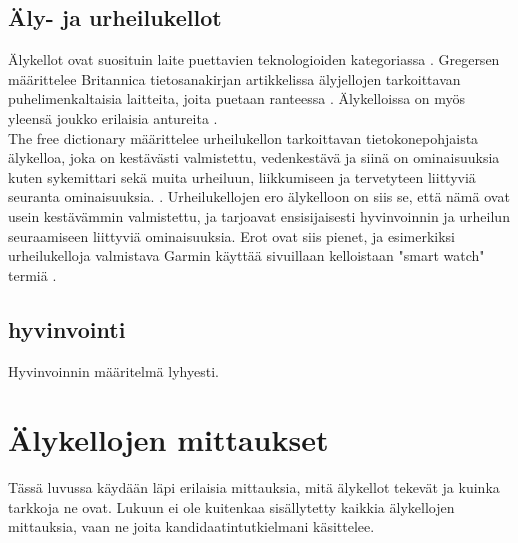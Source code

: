 \documentclass[utf8,bachelor,finnish]{bachelor}
\begin{document}
  \section{Äly- ja urheilukellot}
  Älykellot ovat suosituin laite puettavien teknologioiden kategoriassa \parencite{godfrey2018z}. Gregersen määrittelee Britannica
   tietosanakirjan artikkelissa älyjellojen tarkoittavan puhelimenkaltaisia laitteita, joita puetaan ranteessa \parencite{Gregersen_watch_2023}.
    Älykelloissa on myös yleensä joukko erilaisia antureita \parencite{rawassizadeh_wearables_2014}.\\

  The free dictionary määrittelee urheilukellon tarkoittavan tietokonepohjaista älykelloa, joka on kestävästi valmistettu, vedenkestävä ja siinä on ominaisuuksia kuten
    sykemittari sekä muita urheiluun, liikkumiseen ja tervetyteen liittyviä seuranta ominaisuuksia. \parencite{sportswatch_tfd}. Urheilukellojen ero älykelloon on siis se,
     että nämä ovat usein kestävämmin valmistettu, ja tarjoavat ensisijaisesti hyvinvoinnin ja urheilun seuraamiseen liittyviä ominaisuuksia. Erot ovat siis pienet, 
      ja esimerkiksi urheilukelloja valmistava Garmin käyttää sivuillaan kelloistaan "smart watch" termiä \parencite{garmin_site}. \\
  
\section{hyvinvointi}
Hyvinvoinnin määritelmä lyhyesti.


  \chapter{Älykellojen mittaukset}
  Tässä luvussa käydään läpi erilaisia mittauksia, mitä älykellot tekevät ja kuinka tarkkoja ne ovat. Lukuun ei ole kuitenkaa sisällytetty kaikkia älykellojen mittauksia, vaan
   ne joita kandidaatintutkielmani käsittelee.
\end{document}

